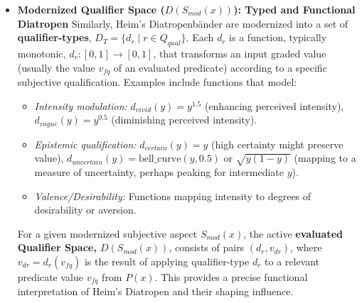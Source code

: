 \documentclass[
    12pt,              %
    a4paper,           %
    headings=normal,   %
    twoside=true,      %
    BCOR=8mm,          %
]{scrbook}
\begin{document}
\begin{itemize}
    \item   \textbf{Modernized Qualifier Space (\(D(S_{mod}(x))\)): Typed and Functional Diatropen}
        Similarly, Heim's Diatropenbänder are modernized into a set of \textbf{qualifier-types}, \(D_T = \{ d_r \mid r \in Q_{qual} \}\). Each \(d_r\) is a function, typically monotonic, \(d_r: [0,1] \to [0,1]\), that transforms an input graded value (usually the value \(v_{fq}\) of an evaluated predicate) according to a specific subjective qualification. Examples include functions that model:
        \begin{itemize}
            \item   \textit{Intensity modulation:} \(d_{vivid}(y) = y^{1.5}\) (enhancing perceived intensity), \(d_{vague}(y) = y^{0.5}\) (diminishing perceived intensity).
            \item   \textit{Epistemic qualification:} \(d_{certain}(y) = y\) (high certainty might preserve value), \(d_{uncertain}(y) = \text{bell\_curve}(y, 0.5)\) or \(\sqrt{y(1-y)}\) (mapping to a measure of uncertainty, perhaps peaking for intermediate \(y\)).
            \item   \textit{Valence/Desirability:} Functions mapping intensity to degrees of desirability or aversion.
        \end{itemize}
        For a given modernized subjective aspect \(S_{mod}(x)\), the active \textbf{evaluated Qualifier Space, \(D(S_{mod}(x))\)}, consists of pairs \((d_r, v_{dr})\), where \(v_{dr} = d_r(v_{fq})\) is the result of applying qualifier-type \(d_r\) to a relevant predicate value \(v_{fq}\) from \(P(x)\). This provides a precise functional interpretation of Heim's Diatropen and their shaping influence.


\end{itemize}
\end{document}
